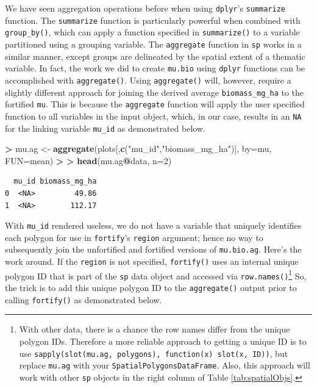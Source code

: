 \documentclass[
]{krantz}
\makeatletter
\newenvironment{Shaded}{\begin{snugshade}}{\end{snugshade}}
\newcommand{\DataTypeTok}[1]{\textcolor[rgb]{0.27,0.27,0.27}{#1}}
\newcommand{\DecValTok}[1]{\textcolor[rgb]{0.06,0.06,0.06}{#1}}
\newcommand{\ErrorTok}[1]{\textcolor[rgb]{0.14,0.14,0.14}{\textbf{#1}}}
\newcommand{\KeywordTok}[1]{\textcolor[rgb]{0.27,0.27,0.27}{\textbf{#1}}}
\newcommand{\NormalTok}[1]{#1}
\newcommand{\OperatorTok}[1]{\textcolor[rgb]{0.43,0.43,0.43}{\textbf{#1}}}
\newcommand{\StringTok}[1]{\textcolor[rgb]{0.5,0.5,0.5}{#1}}
\newenvironment{kframe}{%
\medskip{}
\setlength{\fboxsep}{.8em}
 \def\at@end@of@kframe{}%
 \ifinner\ifhmode%
  \def\at@end@of@kframe{\end{minipage}}%
  \begin{minipage}{\columnwidth}%
 \fi\fi%
 \def\FrameCommand##1{\hskip\@totalleftmargin \hskip-\fboxsep
 \colorbox{shadecolor}{##1}\hskip-\fboxsep
     \hskip-\linewidth \hskip-\@totalleftmargin \hskip\columnwidth}%
 \MakeFramed {\advance\hsize-\width
   \@totalleftmargin\z@ \linewidth\hsize
   \@setminipage}}%
 {\par\unskip\endMakeFramed%
 \at@end@of@kframe}
\renewenvironment{Shaded}{\begin{kframe}}{\end{kframe}}
\makeatother
\begin{document}
We have seen aggregation operations before when using \texttt{dplyr}'s \texttt{summarize} function. The \texttt{summarize} function is particularly powerful when combined with \texttt{group\_by()}, which can apply a function specified in \texttt{summarize()} to a variable partitioned using a grouping variable. The \texttt{aggregate} function in \texttt{sp} works in a similar manner, except groups are delineated by the spatial extent of a thematic variable. In fact, the work we did to create \texttt{mu.bio} using \texttt{dplyr} functions can be accomplished with \texttt{aggregate()}. Using \texttt{aggregate()} will, however, require a slightly different approach for joining the derived average \texttt{biomass\_mg\_ha} to the fortified \texttt{mu}. This is because the \texttt{aggregate} function will apply the user specified function to all variables in the input object, which, in our case, results in an \texttt{NA} for the linking variable \texttt{mu\_id} as demonstrated below.

\begin{Shaded}
\begin{Highlighting}[]
\OperatorTok{\textgreater{}}\StringTok{ }\NormalTok{mu.ag \textless{}{-}}\StringTok{ }\KeywordTok{aggregate}\NormalTok{(plots[,}\KeywordTok{c}\NormalTok{(}\StringTok{"mu\_id"}\NormalTok{,}\StringTok{"biomass\_mg\_ha"}\NormalTok{)], }\DataTypeTok{by=}\NormalTok{mu, }\DataTypeTok{FUN=}\NormalTok{mean)}
\OperatorTok{\textgreater{}}\StringTok{ }
\ErrorTok{\textgreater{}}\StringTok{ }\KeywordTok{head}\NormalTok{(mu.ag}\OperatorTok{@}\NormalTok{data, }\DataTypeTok{n=}\DecValTok{2}\NormalTok{)}
\end{Highlighting}
\end{Shaded}

\begin{verbatim}
  mu_id biomass_mg_ha
0  <NA>         49.86
1  <NA>        112.17
\end{verbatim}

With \texttt{mu\_id} rendered useless, we do not have a variable that uniquely identifies each polygon for use in \texttt{fortify}'s \texttt{region} argument; hence no way to subsequently join the unfortified and fortified versions of \texttt{mu.bio.ag}. Here's the work around. If the \texttt{region} is not specified, \texttt{fortify()} uses an internal unique polygon ID that is part of the \texttt{sp} data object and accessed via \texttt{row.names()}\footnote{With other data, there is a chance the row names differ from the unique polygon IDs. Therefore a more reliable approach to getting a unique ID is to use \texttt{sapply(slot(mu.ag,\ \textquotesingle{}polygons\textquotesingle{}),\ function(x)\ slot(x,\ \textquotesingle{}ID\textquotesingle{}))}, but replace \texttt{mu.ag} with your \texttt{SpatialPolygonsDataFrame}. Also, this approach will work with other \texttt{sp} objects in the right column of Table \ref{tab:spatialObjs}.} So, the trick is to add this unique polygon ID to the \texttt{aggregate()} output prior to calling \texttt{fortify()} as demonstrated below.
\end{document}
